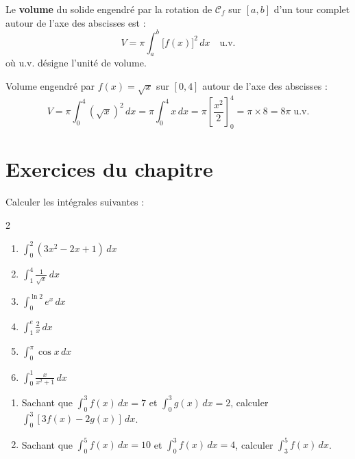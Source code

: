 \begin{definition}
  Le \textbf{volume} du solide engendr\'{e} par la rotation de
  $\mathcal{C}_f$ sur $[a,b]$ d'un tour complet autour de l'axe
  des abscisses est :
  \[
    \boxed{V = \pi \int_a^b \bigl[f(x)\bigr]^2\,dx \quad \text{u.v.}}
  \]
  o\`{u} u.v. d\'{e}signe l'unit\'{e} de volume.
\end{definition}

\begin{exemple}
  Volume engendr\'{e} par $f(x) = \sqrt{x}$ sur $[0,4]$
  autour de l'axe des abscisses :
  \[
    V = \pi\int_0^4 (\sqrt{x})^2\,dx
      = \pi\int_0^4 x\,dx
      = \pi\left[\frac{x^2}{2}\right]_0^4
      = \pi \times 8 = 8\pi\;\text{u.v.}
  \]
\end{exemple}

\newpage
\section*{Exercices du chapitre}

\begin{exercice}
  Calculer les int\'{e}grales suivantes :
  \begin{multicols}{2}
  \begin{enumerate}
    \item $\displaystyle\int_0^2 (3x^2-2x+1)\,dx$
    \item $\displaystyle\int_1^4 \frac{1}{\sqrt{x}}\,dx$
    \item $\displaystyle\int_0^{\ln 2} e^x\,dx$
    \item $\displaystyle\int_1^e \frac{2}{x}\,dx$
    \item $\displaystyle\int_0^{\pi} \cos x\,dx$
    \item $\displaystyle\int_0^1 \frac{x}{x^2+1}\,dx$
  \end{enumerate}
  \end{multicols}
\end{exercice}

\begin{exercice}[2 : Propri\'{e}t\'{e}s]
  \begin{enumerate}
    \item Sachant que $\displaystyle\int_0^3 f(x)\,dx = 7$ et
          $\displaystyle\int_0^3 g(x)\,dx = 2$, calculer
          $\displaystyle\int_0^3 [3f(x) - 2g(x)]\,dx$.
    \item Sachant que $\displaystyle\int_0^5 f(x)\,dx = 10$ et
          $\displaystyle\int_0^3 f(x)\,dx = 4$, calculer
          $\displaystyle\int_3^5 f(x)\,dx$.
  \end{enumerate}
\end{exercice}

